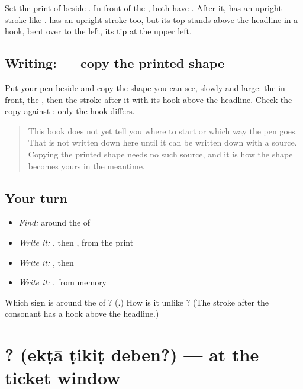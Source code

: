 Set the print of \textbf{} beside \textbf{}. In front of the \textbf{}, both have \textbf{}. After it, \textbf{} has an upright stroke like \textbf{}. \textbf{} has an upright stroke too, but its top stands above the headline in a hook, bent over to the left, its tip at the upper left.

\subsection*{Writing:  — copy the printed shape}
Put your pen beside \textbf{} and copy the shape you can see, slowly and large: the \textbf{} in front, the \textbf{}, then the stroke after it with its hook above the headline. Check the copy against \textbf{}: only the hook differs.

\begin{quote}
This book does not yet tell you where to start  or which way the pen goes. That is not written down here until it can be written down with a source. Copying the printed shape needs no such source, and it is how the shape becomes yours in the meantime.
\end{quote}

\subsection*{Your turn}
\begin{itemize}
\raggedright
  \item \emph{Find:}  around the  of \textbf{}
  \item \emph{Write it:} \textbf{}, then \textbf{}, from the print
  \item \emph{Write it:} \textbf{}, then \textbf{}
  \item \emph{Write it:} \textbf{}, from memory
\end{itemize}

\begin{tcolorbox}[breakable,colback=teal!4,colframe=teal!35!black,title={Before you move on}]
Which sign is around the \textbf{} of \textbf{}? (\textbf{}.) How is it unlike \textbf{}? (The stroke after the consonant has a hook above the headline.)
\end{tcolorbox}
\section[\texorpdfstring{\bn{একটা} \bn{টিকিট} \bn{দেবেন}? (ekṭā ṭikiṭ deben?)}{একটা টিকিট দেবেন? (ekṭā ṭikiṭ deben?)}]{  ? (ekṭā ṭikiṭ deben?) — at the ticket window}

